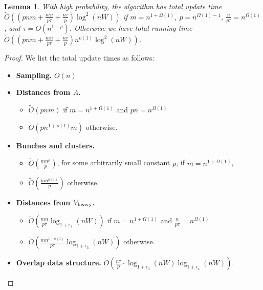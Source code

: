 \documentclass[11pt]{article}
\newtheorem{lemma}[theorem]{Lemma}
\theoremstyle{definition}
\theoremstyle{remark}
\begin{document}
\begin{titlepage}
\begin{lemma}\label{lm:mult_2W_time}
    With high probability, the algorithm \DynAPSPtwoW has total update time $ \tilde O ((pnm + \tfrac{m n }{p\tau}+\tfrac{n\tau}{ p})\log^2(nW)) $ if $m=n^{1+\Omega(1)}$, $p=n^{\Omega(1)-1}$, $\tfrac{n}{p\tau}=n^{\Omega(1)}$, and $\tau = O(n^{1-\rho})$. Otherwise we have total running time $ \tilde O ((pnm +\tfrac{m n }{p\tau} +\tfrac{n\tau}{ p})n^{o(1)}\log^2(nW)) $.
\end{lemma}
\begin{proof}
    We list the total update times as follows:
\begin{itemize}
    \item \textbf{Sampling.} $O(n)$
    \item \textbf{Distances from $A$.}
    \begin{itemize}
	\item $\tilde{O}(pnm)$ if $m=n^{1+\Omega(1)}$ and $pn=n^{\Omega(1)}$
	\item $\tilde O(pn^{1+o(1)}m)$ otherwise.
    \end{itemize}
    \item \textbf{Bunches and clusters.} 
    \begin{itemize}
	\item $ \tilde O (\tfrac{mn^\rho}{p}) $, for some arbitrarily small constant $\rho$, if $m=n^{1+\Omega(1)}$, 
	\item $\tilde O(\tfrac{mn^{o(1)}}{p})$ otherwise.
    \end{itemize}
    \item \textbf{Distances from $ V_{\rm{heavy}} $.}
    \begin{itemize}
	\item $ \tilde O (\tfrac{m n }{p\tau}\log_{1+\epsilon_3}(nW)) $ if $m=n^{1+\Omega(1)}$ and $\tfrac{n}{p\tau}=n^{\Omega(1)}$
	\item $ \tilde O (\tfrac{m n^{1+o(1)} }{p\tau}\log_{1+\epsilon_3}(nW)) $ otherwise.
    \end{itemize}
   \item \textbf{Overlap data structure.} $\tilde O (\tfrac{n\tau }{p} \cdot\log_{1+\epsilon_3}(nW)\log_{1+\epsilon_4}(nW)) $.
\end{itemize}


\end{proof}
\end{titlepage}
\end{document}
